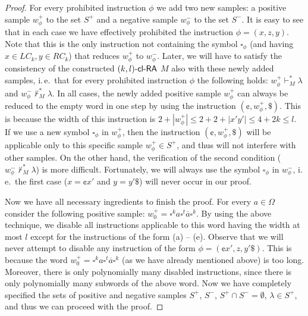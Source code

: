 \begin{proof}
For every prohibited instruction $\phi$ we add two new samples: a positive sample $w_{\phi}^+$ to the set $S^+$ and a negative sample $w_{\phi}^-$ to the set $S^-$. It is easy to see that in each case we have effectively prohibited the instruction $\phi = (x, z, y)$. Note that this is the only instruction not containing the symbol $\square_{\phi}$ (and having $x \in LC_k, y \in RC_k$) that reduces $w_{\phi}^+$ to $w_{\phi}^-$. Later, we will have to satisfy the consistency of the constructed $\textup{\sf $(k,l)$-\textup{\sf cl-RA\/}}$ $M$ also with these newly added samples, i.\,e.\ that for every prohibited instruction $\phi$ the following holds: $w_{\phi}^+ \vdash_M^* \lambda$ and $w_{\phi}^- \not\vdash_M^* \lambda$. In all cases, the newly added positive sample $w_{\phi}^+$ can always be reduced to the empty word in one step by using the instruction $(\cent, w_{\phi}^+, \$)$. This is because the width of this instruction is $2 + |w_{\phi}^+| \le 2 + 2 + |x'y'| \le 4 + 2k \le l$. If we use a new symbol $\square_{\phi}$ in $w_{\phi}^+$, then the instruction $(\cent, w_{\phi}^+, \$)$ will be applicable only to this specific sample $w_{\phi}^+ \in S^+$, and thus will not interfere with other samples. On the other hand, the verification of the second condition ($w_{\phi}^- \not\vdash_M^* \lambda$) is more difficult. Fortunately, we will always use the symbol $\square_{\phi}$ in $w_{\phi}^-$, i.\,e.\ the first case ($x = \cent x'$ and $y = y' \$$) will never occur in our proof.

Now we have all necessary ingredients to finish the proof. For every $a \in \Omega$ consider the following positive sample: $w_0^+ = \square^k a \square^t \overline{a} \square^k$. By using the above technique, we disable all instructions applicable to this word having the width at most $l$ except for the instructions of the form (a) -- (e). Observe that we will never attempt to disable any instruction of the form $\phi = (\cent x', z, y' \$)$. This is because the word $w_0^+ = \square^k a \square^t \overline{a} \square^k$ (as we have already mentioned above) is too long. Moreover, there is only polynomially many disabled instructions, since there is only polynomially many subwords of the above word. Now we have completely specified the sets of positive and negative samples $S^+$, $S^-$, $S^+ \cap S^- = \emptyset$, $\lambda \in S^+$, and thus we can proceed with the proof.


\end{proof}
